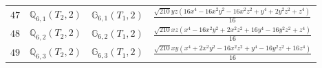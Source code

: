 \documentclass[fleqn,8pt,landscape]{jsarticle}
\begin{document}
\begin{table}[ht!]
\begin{center}
\begin{tabular}{cccl}
$ 47 $ & $ \mathbb{Q}_{6,1}(T_{2},2) $ & $ \mathbb{G}_{6,1}(T_{1},2) $ & $ \frac{\sqrt{210} y z \left(16 x^{4} - 16 x^{2} y^{2} - 16 x^{2} z^{2} + y^{4} + 2 y^{2} z^{2} + z^{4}\right)}{16} $ \\
$ 48 $ & $ \mathbb{Q}_{6,2}(T_{2},2) $ & $ \mathbb{G}_{6,2}(T_{1},2) $ & $ \frac{\sqrt{210} x z \left(x^{4} - 16 x^{2} y^{2} + 2 x^{2} z^{2} + 16 y^{4} - 16 y^{2} z^{2} + z^{4}\right)}{16} $ \\
$ 49 $ & $ \mathbb{Q}_{6,3}(T_{2},2) $ & $ \mathbb{G}_{6,3}(T_{1},2) $ & $ \frac{\sqrt{210} x y \left(x^{4} + 2 x^{2} y^{2} - 16 x^{2} z^{2} + y^{4} - 16 y^{2} z^{2} + 16 z^{4}\right)}{16} $ \\
 \hline \hline
\end{tabular}
\end{center}
\end{table}
\end{document}
